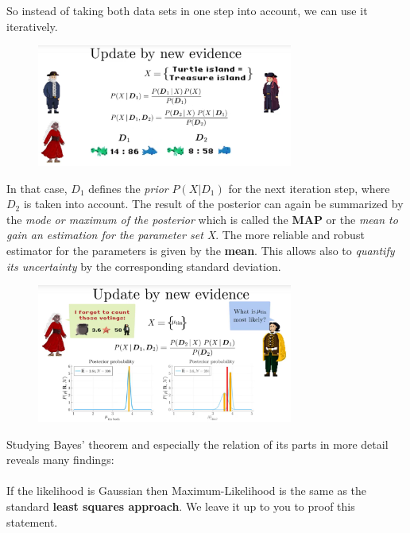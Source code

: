 \documentclass[12pt, a4paper]{scrartcl}
\begin{document}
So instead of taking both data sets in one step into account, we can use it
iteratively. %
 \begin{figure}[H]
	\centering
	\includegraphics[width=0.75\textwidth]{6_13.png}
\end{figure}
In that case, $D_1$ defines the \textit{prior} $P(X|D_1)$ for the next iteration step, where $D_2$ is
taken into account.
The result of the posterior can again be summarized by the \textit{mode or maximum of
the posterior} which is called the \textbf{MAP} or the\textit{ mean to gain an estimation for the parameter
set X}.
The more reliable and robust estimator for the parameters is given by the \textbf{mean}.
This allows also to \textit{quantify its uncertainty} by the corresponding standard
deviation.%
 \begin{figure}[H]
	\centering
	\includegraphics[width=0.75\textwidth]{6_14.png}
\end{figure}
Studying Bayes’ theorem and especially the relation of its parts in more detail
reveals many findings:\\%

\\

If the likelihood is Gaussian then Maximum-Likelihood is the same as
the standard \textbf{least squares approach}. We leave it up to you to proof
this statement.\\%
\end{document}
